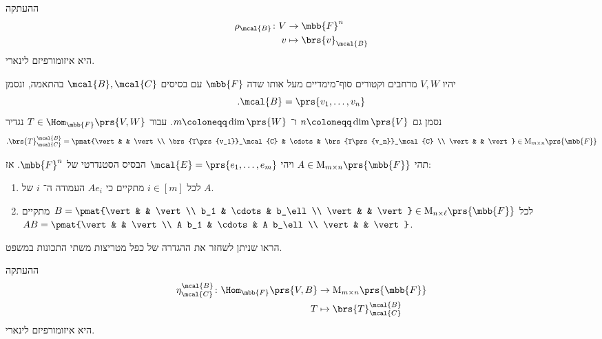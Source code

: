 \documentclass[a4paper,10pt,twoside,openany]{book}
\renewcommand{\Mat}{\mathrm{M}}
\begin{document}
\begin{remark}
ההעתקה
\begin{align*}
\rho_\mcal{B} \colon V &\to \mbb{F}^n \\
v &\mapsto \brs{v}_\mcal{B}
\end{align*}
היא איזומורפיזם לינארי.
\end{remark}

\begin{definition}
יהיו
$V,W$
מרחבים וקטורים סוף־מימדיים מעל אותו שדה
$\mbb{F}$
עם בסיסים
$\mcal{B}, \mcal{C}$
בהתאמה, ונסמן
\[\text{.} \mcal{B} = \prs{v_1, \ldots, v_n}\]
נסמן גם
$n \coloneqq \dim\prs{V}$
ו־%
$m \coloneqq \dim\prs{W}$.
עבור
$T \in \Hom_{\mbb{F}}\prs{V,W}$
נגדיר
\[\text{.} \brs{T}^\mcal{B}_\mcal{C} = \pmat{\vert & & \vert \\ \brs{T\prs{v_1}}_\mcal{C} & \cdots & \brs{T\prs{v_n}}_\mcal{C} \\ \vert & & \vert} \in \Mat_{m \times n}\prs{\mbb{F}}\]
\end{definition}

\begin{theorem}
תהי
$A \in \Mat_{m \times n}\prs{\mbb{F}}$
ויהי
$\mcal{E} = \prs{e_1, \ldots, e_m}$
הבסיס הסטנדרטי של
$\mbb{F}^n$.
אז:
\begin{enumerate}[label = (\roman*)]
\item
לכל
$i \in [m]$
מתקיים כי
$A e_i$
העמודה ה־%
$i$
של
$A$.
\item
לכל
$B = \pmat{\vert & & \vert \\ b_1 & \cdots & b_\ell \\ \vert & & \vert} \in \Mat_{n \times \ell}\prs{\mbb{F}}$
מתקיים
$AB = \pmat{\vert & & \vert \\ A b_1 & \cdots & A b_\ell \\ \vert & & \vert}$.
\end{enumerate}
\end{theorem}

\begin{exercisechap}
הראו שניתן לשחזר את ההגדרה של כפל מטריצות משתי התכונות במשפט.
\end{exercisechap}

\begin{remark}
ההעתקה
\begin{align*}
\eta^\mcal{B}_\mcal{C} \colon \Hom_{\mbb{F}}\prs{V,B} &\to \Mat_{m \times n}\prs{\mbb{F}} \\
T &\mapsto \brs{T}^\mcal{B}_\mcal{C}
\end{align*}
היא איזומורפיזם לינארי.
\end{remark}
\end{document}

